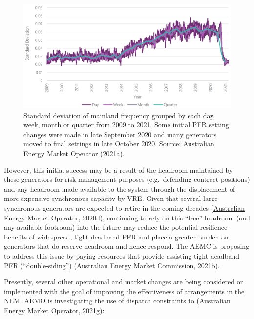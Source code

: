 \documentclass[12pt,a4paper,]{report}
\begin{document}
\begin{figure}
\hypertarget{fig:mpfr_dist}{%
\centering
\includegraphics{source/figures/f_stddev_2009_2021.png}
\caption[Standard deviation of NEM mainland frequency from 2009 to
2021]{Standard deviation of mainland frequency grouped by each day,
week, month or quarter from 2009 to 2021. Some initial PFR setting
changes were made in late September 2020 and many generators moved to
final settings in late October 2020. Source: Australian Energy Market
Operator
(\protect\hyperlink{ref-australianenergymarketoperatorEnduringPrimaryFrequency2021}{2021a}).}\label{fig:mpfr_dist}
}
\end{figure}

However, this initial success may be a result of the headroom maintained
by these generators for risk management purposes (e.g.~defending
contract positions) and any headroom made available to the system
through the displacement of more expensive synchronous capacity by VRE.
Given that several large synchronous generators are expected to retire
in the coming decades
(\protect\hyperlink{ref-australianenergymarketoperator2020IntegratedSystem2020}{Australian
Energy Market Operator, 2020d}), continuing to rely on this ``free''
headroom (and any available footroom) into the future may reduce the
potential resilience benefits of widespread, tight-deadband PFR and
place a greater burden on generators that do reserve headroom and hence
respond. The AEMC is proposing to address this issue by paying resources
that provide assisting tight-deadband PFR (``double-siding'')
(\protect\hyperlink{ref-australianenergymarketcommissionPrimaryFrequencyResponse2021}{Australian
Energy Market Commission, 2021b}).

Presently, several other operational and market changes are being
considered or implemented with the goal of improving the effectiveness
of arrangements in the NEM. AEMO is investigating the use of dispatch
constraints to
(\protect\hyperlink{ref-australianenergymarketoperatorFrequencyControlWork2021}{Australian
Energy Market Operator, 2021g}):
\end{document}
